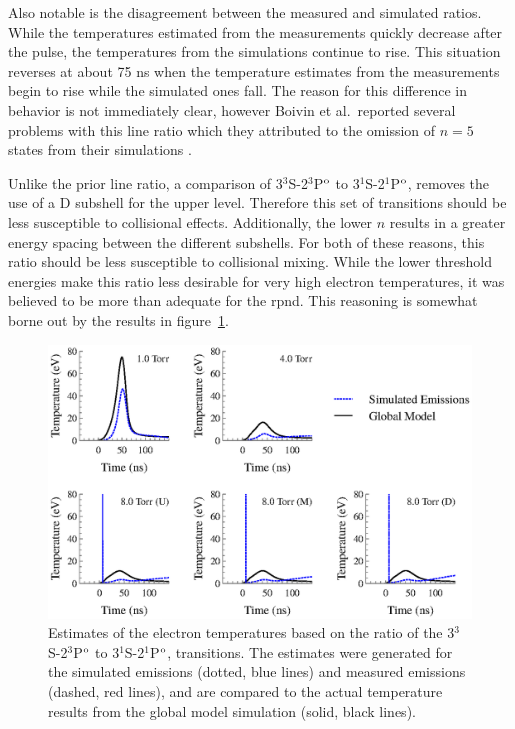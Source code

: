 Also notable is the disagreement between the measured and simulated ratios.
While the temperatures estimated from the measurements quickly decrease after
the pulse, the temperatures from the simulations continue to rise. This
situation reverses at about 75 ns when the temperature estimates from the
measurements begin to rise while the simulated ones fall. The reason for this
difference in behavior is not immediately clear, however Boivin et al.\ reported
several problems with this line ratio which they attributed to the omission of
$n=5$ states from their simulations \cite{Boivin2007}. 

Unlike the prior line ratio, a comparison of 3$^3$S-2$^3$P$^\mathrm{o}$ to
3$^1$S-2$^1$P$^\mathrm{o}$, removes the use of a D subshell for the upper level.
Therefore this set of transitions should be less susceptible to collisional
effects. Additionally, the lower $n$ results in a greater energy spacing between
the different subshells. For both of these reasons, this ratio should be less
susceptible to collisional mixing. While the lower threshold energies make this
ratio less desirable for very high electron temperatures, it was believed to be
more than adequate for the \acs{rpnd}. This reasoning is somewhat borne out by
the results in figure~\ref{fig:rat1comp}.
\begin{figure}
  \centering
  \includegraphics{./chapters/emissions/figures/rat1comp.eps}
  \caption{Estimates of the electron temperatures based on the ratio of the
    3$^3$S-2$^3$P$^\mathrm{o}$ to 3$^1$S-2$^1$P$^\mathrm{o}$, transitions. The estimates were
    generated for the simulated emissions (dotted, blue lines) and measured
    emissions (dashed, red lines), and are compared to the actual temperature
    results from the global model simulation (solid, black lines).}
  \label{fig:rat1comp}
\end{figure}

